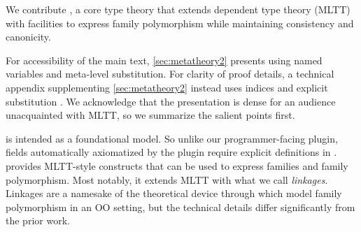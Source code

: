 We contribute \TT, a core type theory that extends
\citeauthor{martin1982constructive} dependent type theory (MLTT)
with facilities to express family polymorphism
while maintaining consistency and canonicity.
%

For accessibility of the main text, \cref{sec:metatheory2} presents \TT using
named variables and meta-level substitution.
For clarity of proof details, a technical appendix supplementing
\cref{sec:metatheory2} instead uses \citeauthor{debruijn1964} indices and explicit substitution \cite{abadi1989subst}.
%
We acknowledge that the presentation is dense for an audience
unacquainted with MLTT, so we summarize the salient points first.


\TT is intended as a foundational model. So unlike our programmer-facing plugin,
fields automatically axiomatized by the plugin require explicit definitions in \TT.
%
\TT provides MLTT-style constructs that can be used to express families and
family polymorphism. %
%
Most notably, it extends MLTT with what we call \emph{linkages}.
Linkages are a namesake of the theoretical device through which \citet{zm2017} model
family polymorphism in an OO setting, but the technical details differ significantly from the prior work.

